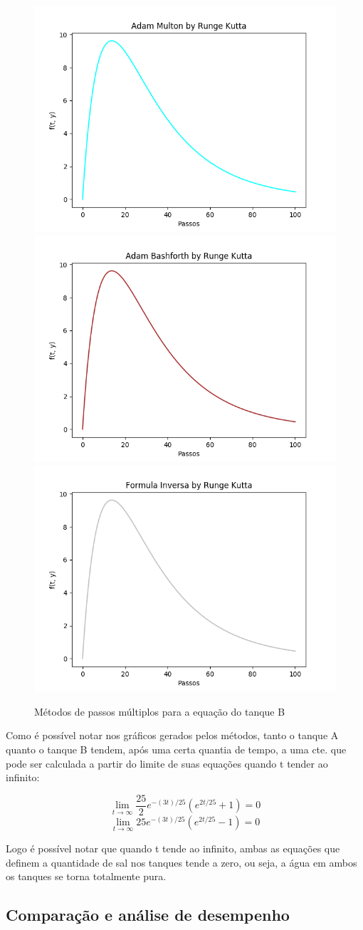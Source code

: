 \documentclass[12pt]{article}%
\begin{document}
    \begin{figure}[H]
        \begin{center}
            \includegraphics[width=.4\textwidth]{problemas/metodos_q1/tanque_b_multon.png}
            \includegraphics[width=.4\textwidth]{problemas/metodos_q1/tanque_b_bashforth.png}
            \includegraphics[width=.4\textwidth]{problemas/metodos_q1/tanque_b_inversa.png}
        \end{center}
        \caption{Métodos de passos múltiplos para a equação do tanque B}
    \end{figure}

    Como é possível notar nos gráficos gerados pelos métodos, tanto o tanque A quanto o tanque B tendem, após uma certa quantia de tempo, a uma cte. que pode ser calculada a partir do limite de suas equações quando t tender ao infinito:
    
    \[\lim_{t\to\infty} \frac{25}{2}e^{-(3t)/25}(e^{2t/25} + 1) = 0\]
    \[\lim_{t\to\infty} 25e^{-(3t)/25}(e^{2t/25} - 1) = 0\]
    
    Logo é possível notar que quando t tende ao infinito, ambas as equações que definem a quantidade de sal nos tanques tende a zero, ou seja, a água em ambos os tanques se torna totalmente pura.

    \subsection{Comparação e análise de desempenho}
    
\end{document}
